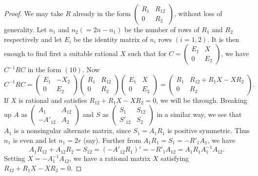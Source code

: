 \begin{proof}
We may take $R$ already in the form $\left(\begin{smallmatrix} R_1 &
  R_{12} \\ 0 & R_2 \end{smallmatrix} \right)$, without loss of
generality. Let $n_1$ and $n_2(=2n-n_1)$ be the number of rows of
$R_1$ \pageoriginale and $R_2$ respectively and let $E_i$ be the
identity matrix of $n_i$ rows $(i=1,2)$. It is then enough to find 
first a suitable rational $X$ such that for $C = \left(\begin{smallmatrix} E_1 & X
  \\ 0 & E_2 \end{smallmatrix} \right) $, we have $C^{-1} R C$ in the
form $(10)$. Now 
$$
C^{-1} R C = \left(\begin{smallmatrix} E_1 & -X_2 \\ 0 &
 E_2 \end{smallmatrix} \right) \left(\begin{smallmatrix} R_1 & R_{12}
  \\ 0 &  R_2 \end{smallmatrix} \right) \left(\begin{smallmatrix} E_1
  & X \\ 0 & E_2 \end{smallmatrix} \right) = \left(\begin{smallmatrix}
  R_1 & R_{12}+R_1X-X R_2 \\ 0 & R_2 \end{smallmatrix} \right) .
$$ 
If $X$ is rational and satisfies $R_{12}+R_1X-X R_2=0$, we will be
through. Breaking up $A$ as $\left(\begin{smallmatrix} A_1 & A_{12}
  \\ -A'_{12} & A_2 \end{smallmatrix} \right)$ and $S$ as
$\left(\begin{smallmatrix} S_1 & S_{12} \\ S'_{12} &
  S_2 \end{smallmatrix} \right)$ in a similar way, we see that $A_1$
is a nonsingular alternate matrix, since $S_1=A_1 R_1$ is positive
symmetric. Thus $n_1$ is even and let $n_1=2r$ (say). Further from
$A_1 R_1=S_1=-R'_1 A_1$, we have 
$$
A_1 R_{12} + A_{12} R_2 = S_{12} = (-A'_{12} R_1)' = - R'_1 A_{12} =
A_1 R_1 A^{-1}_1 A_{12}.
$$
Setting $X=-A^{-1}_1 A_{12}$, we have a rational matrix $X$ satisfying
$R_{12}+R_1X-X R_2 = 0$. 


\end{proof}
